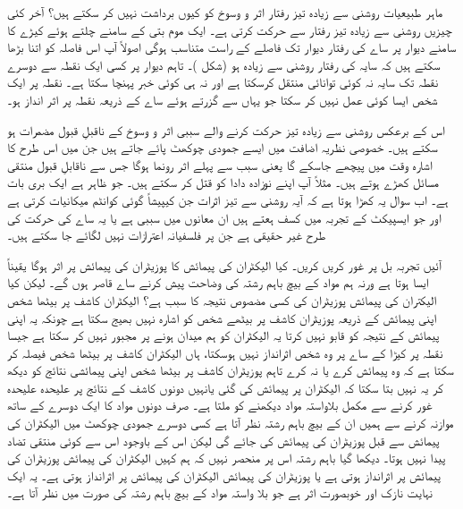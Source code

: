 ماہر طبیعیات روشنی سے زیادہ تیز رفتار اثر و وسوخ کو کیوں برداشت نہیں کر سکتے ہیں؟ آخر کئی چیزیں روشنی سے زیادہ تیز رفتار سے حرکت کرتی ہے۔ ایک موم بتی کے سامنے چلتے ہوئے کیڑے کا سامنے دیوار پر ساے کی رفتار دیوار تک فاصلے کے راست متناسب ہوگی اصولاً آپ اس فاصلہ کو اتنا بڑھا سکتے ہیں کہ سایہ کی رفتار روشنی سے زیادہ ہو (شکل )۔ تاہم دیوار پر کسی ایک نقطہ سے دوسرے نقطہ تک سایہ نہ کوئی توانائی منتقل کرسکتا ہے اور نہ ہی کوئی خبر پہنچا سکتا ہے۔ نقطہ  پر ایک شخص ایسا کوئی عمل نہیں کر سکتا جو یہاں سے گزرتے ہوئے ساے کے ذریعہ نقطہ  پر اثر انداز ہو۔


اس کے برعکس روشنی سے زیادہ تیز حرکت کرنے والے سببی اثر و وسوخ کے ناقبلِ قبول مضمرات ہو سکتے ہیں۔ خصوصی نظریہ اضافت میں ایسے جمودی چوکھٹ پائے جاتے ہیں جن میں اس طرح کا اشارہ وقت میں پیچھے جاسکے گا یعنی سبب سے پہلے اثر رونما ہوگا جس سے ناقابلِ قبول منتقی مسائل کھڑے ہوتے ہیں۔ مثلاً آپ اپنے نوزادہ دادا کو قتل کر سکتے ہیں۔ جو ظاہر ہے ایک بری بات ہے۔ اب سوال یہ کھڑا ہوتا ہے کہ آیہ روشنی سے تیز اثرات جن کیپیشاً گوئی کوانٹم میکانیات کرتی ہے اور جو ایسپیکٹ کے تجربہ میں کسف ہعتے ہیں ان معانوں میں سببی ہے یا یہ ساے کی حرکت کی طرح غیر حقیقی ہے جن پر فلسفیانہ اعترازات نہیں لگائے جا سکتے ہیں۔

آئیں تجربہ بل پر غور کریں کریں۔ کیا الیکٹران کی پیمائش کا پوزیٹران کی پیمائش پر اثر ہوگا  یقیناً ایسا ہوتا ہے ورنہ ہم مواد کے بیچ باہم رشتہ کی وضاحت پیش کرنے ساے قاصر ہوں گے۔ لیکن کیا الیکتران کی پیمائش پوزیٹران کی کسی مضصوص نتیجہ کا سبب ہے؟ الیکٹران کاشف پر بیٹھا شخص اپنی پیمائش کے ذریعہ پوزیٹران کاشف پر بیٹھے شخص کو اشارہ نہیں بھیج سکتا ہے چونکہ یہ اپنی پیمائش کے نتیجہ کو قابو نہیں کرتا یہ الیکٹران کو ہم میدان ہونے پر مجبور نہیں  کر سکتا ہے جیسا نقطہ  پر کیڑا کے ساے پر وہ شخص اثرانداز نہیں ہوسکتا، ہاں الیکٹران کاشف پر بیٹھا شخص فیصلہ کر سکتا ہے کہ وہ پیمائش کرے یا نہ کرے تاہم پوزیٹران کاشف پر بیٹھا شخص اپنی پیمائشی نتائج کو دیکھ کر یہ نہیں بتا سکتا کہ الیکٹران پر پیمائش کی گئی یانہیں دونوں کاشف کے نتائج پر علیحدہ علیحدہ غور کرنے سے مکمل بلاواستہ مواد دیکھنے کو ملتا ہے۔ صرف دونوں مواد کا ایک دوسرے کے ساتھ موازنہ کرنے سے ہمیں ان کے بیچ باہم رشتہ نظر آتا ہے کسی دوسرے جمودی چوکھٹ میں الیکٹران کی پیمائش سے قبل پوزیٹران کی پیمائش کی جائے گی لیکن اس کے باوجود اس سے کوئی منتقی تضاد پیدا نہیں ہوتا۔ دیکھا گیا باہم رشتہ اس پر منحصر نہیں کہ ہم کہیں الیکٹران کی پیمائش پوزیٹران کی پیمائش پر اثرانداز ہوتی ہے یا پوزیٹران کی پیمائش الیکٹران کی پیمائش پر اثرانداز ہوتی ہے۔ یہ ایک نہایت نازک اور خوبصورت اثر ہے جو بلا واستہ مواد کے بیچ باہم رشتہ کی صورت میں نظر آتا ہے۔

